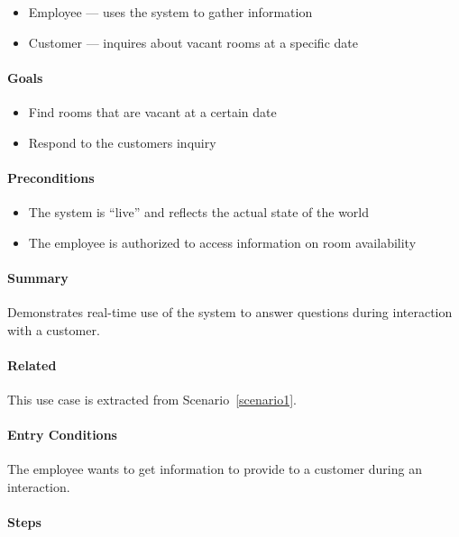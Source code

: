 \begin{itemize}
\tightlist
\item
  Employee --- uses the system to gather information
\item
  Customer --- inquires about vacant rooms at a specific date
\end{itemize}

\paragraph{Goals}

\begin{itemize}
\tightlist
\item
  Find rooms that are vacant at a certain date
\item
  Respond to the customers inquiry
\end{itemize}

\paragraph{Preconditions}

\begin{itemize}
\tightlist
\item
  The system is ``live'' and reflects the actual state of the world
\item
  The employee is authorized to access information on room availability
\end{itemize}

\paragraph{Summary}

Demonstrates real-time use of the system to answer questions during
interaction with a customer.

\paragraph{Related}
This use case is extracted from Scenario~\ref{scenario1}.

\paragraph{Entry Conditions}

The employee wants to get information to provide to a customer during an
interaction.

\paragraph{Steps}

